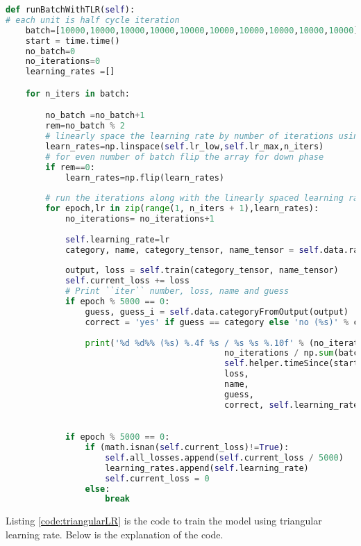  \begin{lstlisting}[language=Python,label={code:triangularLR}, caption={Triangular learning rate}]
def runBatchWithTLR(self):
# each unit is half cycle iteration 
    batch=[10000,10000,10000,10000,10000,10000,10000,10000,10000,10000]        
    start = time.time()
    no_batch=0
    no_iterations=0
    learning_rates =[]

    for n_iters in batch:

        no_batch =no_batch+1
        rem=no_batch % 2
        # linearly space the learning rate by number of iterations using np.linspace
        learn_rates=np.linspace(self.lr_low,self.lr_max,n_iters)
        # for even number of batch flip the array for down phase
        if rem==0:
            learn_rates=np.flip(learn_rates)
        
        # run the iterations along with the linearly spaced learning rate.
        for epoch,lr in zip(range(1, n_iters + 1),learn_rates):
            no_iterations= no_iterations+1
    
            self.learning_rate=lr              
            category, name, category_tensor, name_tensor = self.data.randomTrainingExample()
            
            output, loss = self.train(category_tensor, name_tensor)
            self.current_loss += loss
            # Print ``iter`` number, loss, name and guess
            if epoch % 5000 == 0:
                guess, guess_i = self.data.categoryFromOutput(output)
                correct = 'yes' if guess == category else 'no (%s)' % category
            
                print('%d %d%% (%s) %.4f %s / %s %s %.10f' % (no_iterations, 
                                            no_iterations / np.sum(batch) * 100,
                                            self.helper.timeSince(start),
                                            loss,
                                            name, 
                                            guess, 
                                            correct, self.learning_rate))

         
            if epoch % 5000 == 0:
                if (math.isnan(self.current_loss)!=True):
                    self.all_losses.append(self.current_loss / 5000)
                    learning_rates.append(self.learning_rate)
                    self.current_loss = 0
                else:
                    break
\end{lstlisting}

Listing \ref{code:triangularLR} is the code to train the model using triangular learning rate. Below is the explanation of the code.

